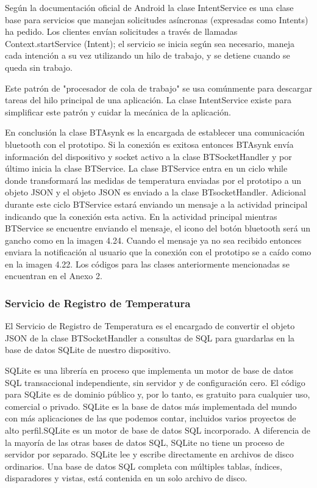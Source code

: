 \par \noindent
Según la documentación oficial de Android la clase IntentService es una clase base para servicios que manejan solicitudes asíncronas (expresadas como Intents) ha pedido. Los clientes envían solicitudes a través de llamadas Context.startService (Intent); el servicio se inicia según sea necesario, maneja cada intención a su vez utilizando un hilo de trabajo, y se detiene cuando se queda sin trabajo.\cite{intentservice}

\par \noindent
Este patrón de "procesador de cola de trabajo" se usa comúnmente para descargar tareas del hilo principal de una aplicación. La clase IntentService existe para simplificar este patrón y cuidar la mecánica de la aplicación. \cite{intentservice}

\par \noindent
En conclusión la clase BTAsynk es la encargada de establecer una comunicación bluetooth con el prototipo. Si la conexión es exitosa entonces BTAsynk envía información del dispositivo y socket activo a la clase BTSocketHandler y por último inicia la clase BTService. La clase BTService entra en un ciclo while donde transformará las medidas de temperatura enviadas por el prototipo a un objeto JSON y el objeto JSON es enviado a la clase BTsocketHandler. Adicional durante este ciclo BTService estará enviando un mensaje a la actividad principal indicando que la conexión esta activa. En la actividad principal mientras BTService se encuentre enviando el mensaje, el icono del botón bluetooth será un gancho como en la imagen 4.24. Cuando el mensaje ya no sea recibido entonces enviara la notificación al usuario que la conexión con el prototipo se a caído como en la imagen 4.22. Los códigos para las clases anteriormente mencionadas se encuentran en el Anexo 2.

\subsubsection{Servicio de Registro de Temperatura}

\par 
El Servicio de Registro de Temperatura es el encargado de convertir el objeto JSON de la clase BTSocketHandler a consultas de SQL para guardarlas en la base de datos SQLite de nuestro dispositivo.

\par \noindent
SQLite es una librería en proceso que implementa un motor de base de datos SQL transaccional independiente, sin servidor y de configuración cero. El código para SQLite es de dominio público y, por lo tanto, es gratuito para cualquier uso, comercial o privado. SQLite es la base de datos más implementada del mundo con más aplicaciones de las que podemos contar, incluidos varios proyectos de alto perfil.SQLite es un motor de base de datos SQL incorporado. A diferencia de la mayoría de las otras bases de datos SQL, SQLite no tiene un proceso de servidor por separado. SQLite lee y escribe directamente en archivos de disco ordinarios. Una base de datos SQL completa con múltiples tablas, índices, disparadores y vistas, está contenida en un solo archivo de disco.\cite{sqlite}

